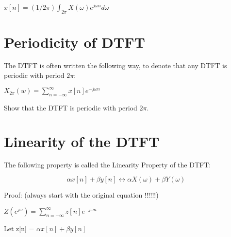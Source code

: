 \documentclass[11pt]{article}
\begin{document}
\begin{center}

$
x[n] = (1/{2 \pi}) \int_{2 \pi}  X(\omega) e^{j \omega n} d \omega
$
\end{center}

\vspace{5mm}


\section{Periodicity of DTFT}

The DTFT is often written the following way, to denote that any DTFT is periodic with period $2 \pi$: \newline

\begin{center}

$
X_{2 \pi} (w) =\sum_{n = -\infty}^{\infty} x[n]  e^{-j \omega n}
$
\end{center}

\vspace{4mm}

Show that the DTFT is periodic with period $2 \pi$.



\vspace{3mm}


\section{Linearity of the DTFT}

The following property is called the Linearity Property of the DTFT:

\begin{center}

$$
\alpha x[n] + \beta y[n] \longleftrightarrow  \alpha X(\omega) + \beta Y(\omega)
$$
\end{center}

\vspace{4mm}

Proof: (always start with the original equation !!!!!!)\newline

\begin{center}

$ 
Z(e^{j \omega}) = \sum_{n = -\infty}^{\infty} z[n]  e^{-j \omega n}
$
\end{center}

\vspace{3mm}

Let z[n] = $\alpha x[n] + \beta y[n]$ \newline
\end{document}
